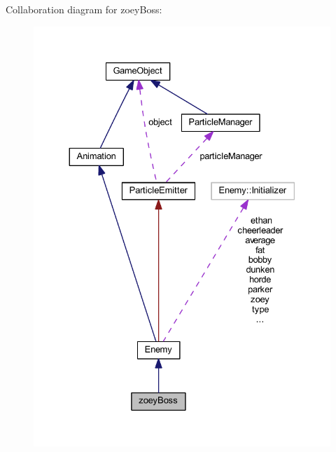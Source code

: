 Collaboration diagram for zoey\+Boss\+:\nopagebreak
\begin{figure}[H]
\begin{center}
\leavevmode
\includegraphics[width=330pt]{classzoey_boss__coll__graph}
\end{center}
\end{figure}
